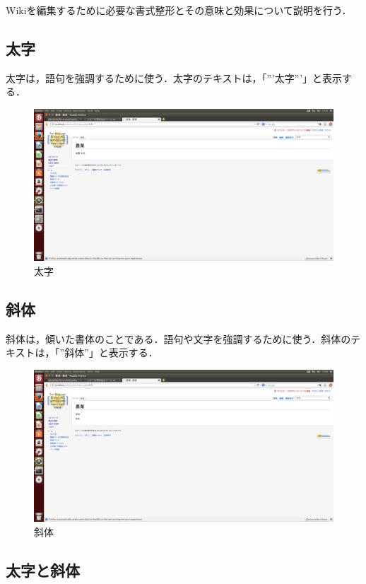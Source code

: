 Wikiを編集するために必要な書式整形とその意味と効果について説明を行う．

\subsection{太字}

太字は，語句を強調するために使う．太字のテキストは，「'''太字'''」と表示する．


\begin{figure}[htb]
\centering
\includegraphics[width=15cm]{hutomozi}
\caption{太字}\label{図}
\end{figure}

\subsection{斜体}
斜体は，傾いた書体のことである．語句や文字を強調するために使う．斜体のテキストは，「''斜体''」と表示する．

\begin{figure}[htb]
\centering
\includegraphics[width=14cm]{syatai}
\caption{斜体}\label{図}
\end{figure}


\subsection{太字と斜体}

